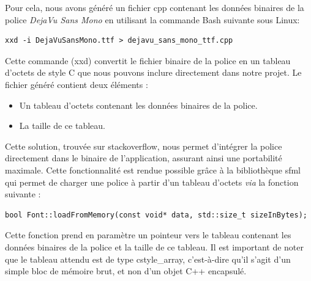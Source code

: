Pour cela, nous avons généré un fichier \gls{cpp} contenant les données binaires de la police \textit{DejaVu Sans Mono} en utilisant la commande Bash suivante sous Linux:
\begin{lstlisting}[style=BashStyle,label={lst:generation_dejavusansmonottf_h}]
xxd -i DejaVuSansMono.ttf > dejavu_sans_mono_ttf.cpp
\end{lstlisting}
Cette commande (\gls{xxd}) convertit le fichier binaire de la police en un tableau d'octets de style C que nous pouvons inclure directement dans notre projet.
Le fichier généré contient deux éléments :
\begin{itemize}
    \item Un tableau d'octets contenant les données binaires de la police.
    \item La taille de ce tableau.
\end{itemize}

Cette solution, trouvée sur \gls{stackoverflow}\cite{stackoverflow_embed_font}, nous permet d'intégrer la police directement dans le binaire de l'application, assurant ainsi une portabilité maximale.
Cette fonctionnalité est rendue possible grâce à la bibliothèque \gls{sfml} qui permet de charger une police à partir d'un tableau d'octets \textit{via} la fonction suivante :

\begin{lstlisting}[style=CStyle,label={lst:load_from_memory}]
bool Font::loadFromMemory(const void* data, std::size_t sizeInBytes);
\end{lstlisting}

Cette fonction prend en paramètre un pointeur vers le tableau contenant les données binaires de la police et la taille de ce tableau.
Il est important de noter que le tableau attendu est de type \gls{cstyle_array}, c'est-à-dire qu'il s'agit d'un simple bloc de mémoire brut, et non d'un objet C++ encapsulé.

